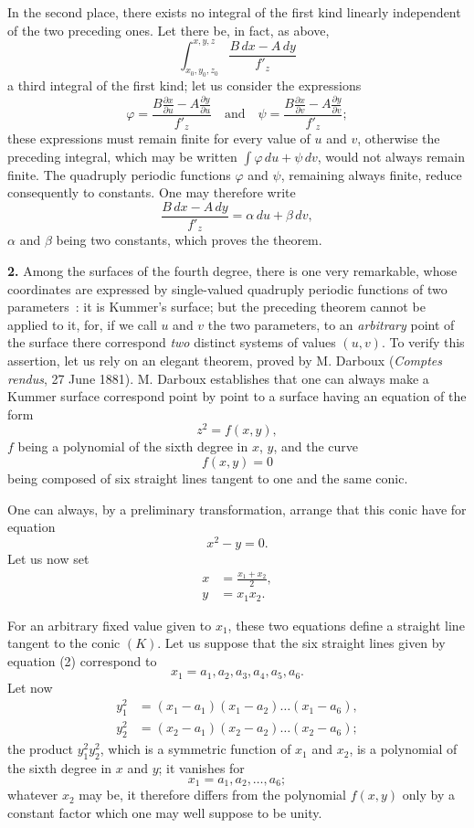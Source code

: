 \documentclass{article}
\begin{document}
In the second place, there exists no integral of the first kind linearly independent of the two preceding ones. Let there be, in fact, as above,
\[
\int_{x_{0}, y_{0}, z_{0}}^{x, y, z} \frac{B\,dx - A\,dy}{f'_{z}}
\]
a third integral of the first kind; let us consider the expressions
\[
\varphi = \frac{B \frac{\partial x}{\partial u} - A \frac{\partial y}{\partial u}}{f'_{z}} \quad \text{and} \quad \psi = \frac{B \frac{\partial x}{\partial v} - A \frac{\partial y}{\partial v}}{f'_{z}};
\]
these expressions must remain finite for every value of $u$ and $v$, otherwise the preceding integral, which may be written $\displaystyle\int \varphi\,du + \psi\,dv$, would not always remain finite. The quadruply periodic functions $\varphi$ and $\psi$, remaining
always finite, reduce consequently to constants. One may therefore write
\[
\frac{B\,dx - A\,dy}{f'_{z}} = \alpha\,du + \beta\,dv,
\]
$\alpha$ and $\beta$ being two constants, which proves the theorem.

\textbf{2.} Among the surfaces of the fourth degree, there is one very remarkable, whose coordinates are expressed by single-valued quadruply periodic functions of two parameters~: it is Kummer's surface; but the preceding theorem cannot be applied to it, for, if we call $u$ and $v$ the two parameters, to an \emph{arbitrary} point of the surface there correspond \emph{two} distinct systems of values $(u, v)$. To verify this assertion, let us rely on an elegant theorem, proved by M. Darboux (\emph{Comptes rendus}, 27 June 1881). M. Darboux establishes that one can always make a Kummer surface correspond point by point to a surface having an equation of the form
\[
z^{2} = f(x, y),
\tag{1}
\]
$f$ being a polynomial of the sixth degree in $x$, $y$, and the curve
\[
f(x, y) = 0
\tag{2}
\]
being composed of six straight lines tangent to one and the same conic.

One can always, by a preliminary transformation, arrange that this conic have for equation
\[
x^{2} - y = 0.
\tag{K}
\]
Let us now set
\[
\begin{aligned}
x &= \frac{x_{1} + x_{2}}{2}, \\
y &= x_{1}x_{2}.
\end{aligned}
\]

For an arbitrary fixed value given to $x_{1}$, these two equations define a straight line tangent to the conic $(K)$. Let us suppose that the six
straight lines given by equation (2) correspond to
\[
x_{1} = a_{1}, a_{2}, a_{3}, a_{4}, a_{5}, a_{6}.
\]
Let now
\[
\begin{aligned}
y_{1}^{2} &= (x_{1} - a_{1})(x_{1} - a_{2})\ldots(x_{1} - a_{6}), \\
y_{2}^{2} &= (x_{2} - a_{1})(x_{2} - a_{2})\ldots(x_{2} - a_{6});
\end{aligned}
\]
the product $y_{1}^{2}y_{2}^{2}$, which is a symmetric function of $x_{1}$ and $x_{2}$, is a polynomial of the sixth degree in $x$ and $y$; it vanishes for
\[
x_{1} = a_{1}, a_{2}, \ldots, a_{6};
\]
whatever $x_{2}$ may be, it therefore differs from the polynomial $f(x, y)$ only by a constant factor which one may well suppose to be unity.
\end{document}
